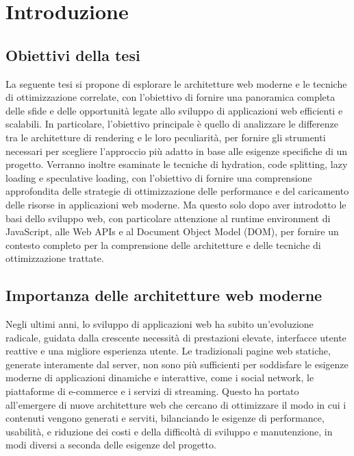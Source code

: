 \chapter*{Introduzione}

\section*{Obiettivi della tesi}
La seguente tesi si propone di esplorare le architetture web moderne e le tecniche di ottimizzazione correlate, con
l'obiettivo di fornire una panoramica completa delle sfide e delle opportunità legate allo sviluppo di applicazioni web
efficienti e scalabili. In particolare, l'obiettivo principale è quello di analizzare le differenze tra le architetture
di rendering e le loro peculiarità, per fornire gli strumenti necessari per scegliere l'approccio più adatto in base
alle esigenze specifiche di un progetto.
Verranno inoltre esaminate le tecniche di hydration, code splitting, lazy loading e speculative loading, con l'obiettivo
di fornire una comprensione approfondita delle strategie di ottimizzazione delle performance e del caricamento delle
risorse in applicazioni web moderne.
Ma questo solo dopo aver introdotto le basi dello sviluppo web, con particolare attenzione al runtime environment di
JavaScript, alle Web APIs e al Document Object Model (DOM), per fornire un contesto completo per la comprensione delle
architetture e delle tecniche di ottimizzazione trattate.

\section*{Importanza delle architetture web moderne}

Negli ultimi anni, lo sviluppo di applicazioni web ha subito un'evoluzione radicale, guidata dalla crescente necessità
di prestazioni elevate, interfacce utente reattive e una migliore esperienza utente. Le tradizionali pagine web
statiche, generate interamente dal server, non sono più sufficienti per soddisfare le esigenze moderne di
applicazioni dinamiche e interattive, come i social network, le piattaforme di e-commerce e i
servizi di streaming. Questo ha portato all’emergere di nuove architetture web che cercano di ottimizzare il modo in cui
i contenuti vengono generati e serviti, bilanciando le esigenze di performance, usabilità, e riduzione dei costi e della
difficoltà di sviluppo e manutenzione, in modi diversi a seconda delle esigenze del progetto.

